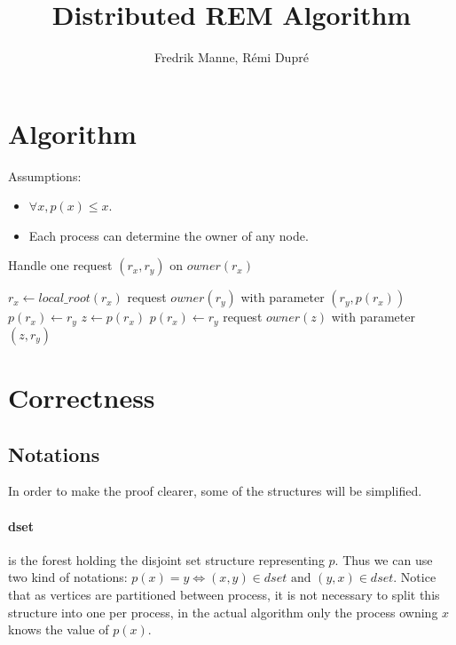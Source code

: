 \documentclass[12px]{article}
\title{Distributed REM Algorithm}
\author{Fredrik Manne, Rémi Dupré}
\begin{document}
  \maketitle

  \section{Algorithm}
  Assumptions:
  \begin{itemize}
    \item $\forall x, p(x) \leq x$.
    \item Each process can determine the owner of any node.
  \end{itemize}

  \begin{algorithm}
    \caption{Handle one request $(r_x, r_y)$ on $owner(r_x)$}
    \begin{algorithmic}
      \State $r_x \gets local\_root(r_x)$
      \State
        \State request $owner(r_y)$ with parameter $(r_y, p(r_x))$
          \State $p(r_x) \gets r_y$
        \Else
          \State $z \gets p(r_x)$
          \State $p(r_x) \gets r_y$
          \State request $owner(z)$ with parameter $(z, r_y)$
        \EndIf
      \EndIf
    \end{algorithmic}
    \label{algo:handle_task}
  \end{algorithm}


  \section{Correctness}

  \subsection{Notations}
    In order to make the proof clearer, some of the structures will be simplified.

    \paragraph{dset} is the forest holding the disjoint set structure representing $p$. Thus we can use two kind of notations: $p(x) = y \Leftrightarrow (x, y) \in dset \text{ and } (y, x) \in dset$. Notice that as vertices are partitioned between process, it is not necessary to split this structure into one per process, in the actual algorithm only the process owning $x$ knows the value of $p(x)$.
\end{document}
